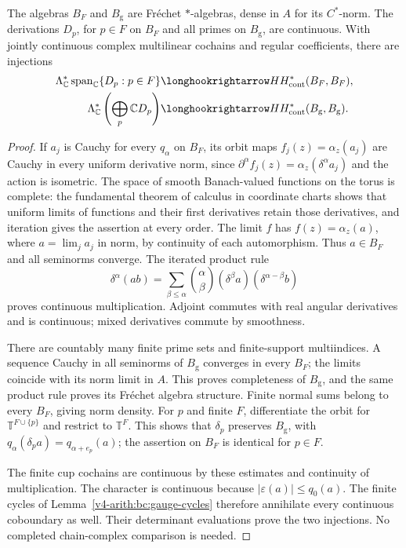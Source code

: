 \begin{proposition}
\label{v4-arith:bc:gauge-smooth}
The algebras \(B_F\) and \(B_{\mathrm g}\) are Fr\'echet
\(*\)-algebras, dense in \(A\) for its \(C^*\)-norm.
The derivations \(D_p\), for \(p\in F\) on \(B_F\) and all primes
on \(B_{\mathrm g}\), are continuous. With jointly continuous
complex multilinear cochains and regular coefficients, there are
injections
\begin{align*}
 \Lambda_{\mathbb C}^*\operatorname{span}_{\mathbb C}\{D_p:p\in F\}
  &\longhookrightarrow HH^*_{\mathrm{cont}}(B_F,B_F),\\
 \Lambda_{\mathbb C}^*\left(\bigoplus_p\mathbb C D_p\right)
  &\longhookrightarrow HH^*_{\mathrm{cont}}(B_{\mathrm g},B_{\mathrm g}).
\end{align*}
\end{proposition}
\begin{proof}
If \(a_j\) is Cauchy for every \(q_\alpha\) on \(B_F\), its
orbit maps \(f_j(z)=\alpha_z(a_j)\) are Cauchy in every uniform
derivative norm, since
\(\partial^\alpha f_j(z)=\alpha_z(\delta^\alpha a_j)\)
and the action is isometric. The space of smooth Banach-valued
functions on the torus is complete: the fundamental theorem of
calculus in coordinate charts shows that uniform limits of functions
and their first derivatives retain those derivatives, and iteration
gives the assertion at every order. The limit \(f\) has
\(f(z)=\alpha_z(a)\), where \(a=\lim_j a_j\) in norm, by continuity
of each automorphism. Thus \(a\in B_F\) and all seminorms converge.
The iterated product rule
\[
 \delta^\alpha(ab)=\sum_{\beta\le\alpha}\binom\alpha\beta
       (\delta^\beta a)(\delta^{\alpha-\beta}b)
\]
proves continuous multiplication. Adjoint commutes with real angular
derivatives and is continuous; mixed derivatives commute by smoothness.

There are countably many finite prime sets and finite-support
multiindices. A sequence Cauchy in all seminorms of \(B_{\mathrm g}\)
converges in every \(B_F\); the limits coincide with its norm limit
in \(A\). This proves completeness of \(B_{\mathrm g}\), and the
same product rule proves its Fr\'echet algebra structure.
Finite normal sums belong to every \(B_F\), giving norm density.
For \(p\) and finite \(F\), differentiate the orbit for
\(\mathbb T^{F\cup\{p\}}\) and restrict to \(\mathbb T^F\).
This shows that \(\delta_p\) preserves \(B_{\mathrm g}\), with
\(q_\alpha(\delta_p a)=q_{\alpha+e_p}(a)\); the assertion on
\(B_F\) is identical for \(p\in F\).

The finite cup cochains are continuous by these estimates and
continuity of multiplication. The character is continuous because
\(|\varepsilon(a)|\le q_0(a)\). The finite cycles of
Lemma~\ref{v4-arith:bc:gauge-cycles} therefore annihilate every
continuous coboundary as well. Their determinant evaluations prove
the two injections. No completed chain-complex comparison is needed.
\end{proof}

